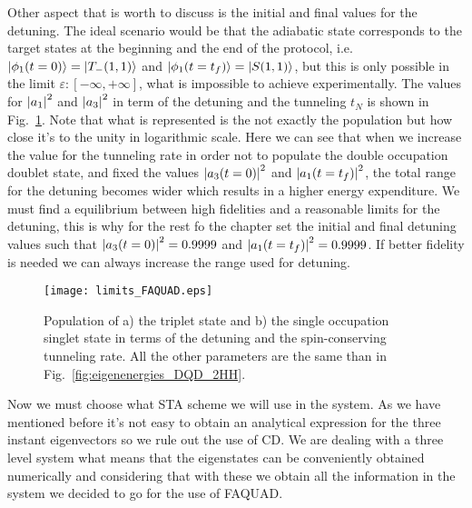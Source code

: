Other aspect that is worth to discuss is the initial and final values for the detuning. The ideal scenario would be that the adiabatic state corresponds to the target states at the beginning and the end of the protocol, i.e. $\ket{\phi_1(t=0)}=\ket{T_-(1,1)}$ and $\ket{\phi_1(t=t_f)}=\ket{S(1,1)}$, but this is only possible in the limit $\varepsilon:[-\infty,+\infty]$, what is impossible to achieve experimentally. The values for $\abs{a_1}^2$ and $\abs{a_3}^2$ in term of the detuning and the tunneling $t_N$ is shown in Fig.~\ref{fig:limits_FAQUAD}. Note that what is represented is the not exactly the population but how close it's to the unity in logarithmic scale. Here we can see that when we increase the value for the tunneling rate in order not to populate the double occupation doublet state, and fixed the values $\abs{a_3(t=0)}^2$ and $\abs{a_1(t=t_f)}^2$, the total range for the detuning becomes wider which results in a higher energy expenditure. We must find a equilibrium between high fidelities and a reasonable limits for the detuning, this is why for the rest fo the chapter set the initial and final detuning values such that $\abs{a_3(t=0)}^2=0.9999$ and $\abs{a_1(t=t_f)}^2=0.9999$. If better fidelity is needed we can always  increase the range used for detuning.\\
\begin{figure}[!htb]
	\centering
	\texttt{[image: limits\_FAQUAD.eps]}
	\caption{Population of a) the triplet state and b) the single occupation singlet state in terms of the detuning and the spin-conserving tunneling rate. All the other parameters are the same than in Fig.~\ref{fig:eigenenergies_DQD_2HH}.}
	\label{fig:limits_FAQUAD}
\end{figure}

Now we must choose what STA scheme we will use in the system. As we have mentioned before it's not easy to obtain an analytical expression for the three instant eigenvectors so we rule out the use of CD. We are dealing with a three level system what means that the eigenstates can be conveniently obtained numerically and considering that with these we obtain all the information in the system we decided to go for the use of FAQUAD.
